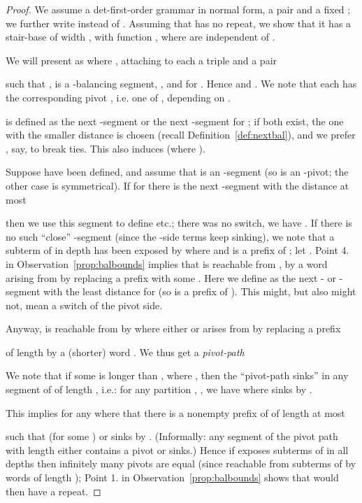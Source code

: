 \documentclass[12pt]{article}
\begin{document}
\begin{proof}
We assume a det-first-order grammar  in
normal form,
a pair  and a fixed ; 
we further write
 instead of . 
Assuming that  has no repeat, we show that it has
a stair-base of
width , with function , where  are independent of
.

We will present  as  where ,
attaching to each  a triple  and a pair 

such that
,  is a -balancing
segment,  ,
 and
 for .
Hence   and
 .
We note that each  has the corresponding pivot
, i.e. one of , depending on .

 is defined as the next -segment
or the next -segment for ; if both
exist, the one with the 
smaller distance is chosen
(recall Definition~\ref{def:nextbal}), and  we prefer
, say, to break ties. This also induces  
(where ). 

Suppose  
have been
defined, and assume that  is an -segment 
(so  is an -pivot; the other case is symmetrical). 
If for 
there is the next -segment
with the distance at most

then we use 
this segment to define  etc.; there was no switch, we
have .
If there is no such ``close'' 
-segment (since the -side terms keep sinking),
we note
that a subterm of  in depth  has been
exposed by  where  and 
 is a prefix of ;
let . 
Point 4. in Observation~\ref{prop:balbounds} implies that 
 is reachable from , by a word arising from  by
replacing a prefix  with some .
Here we define 
 as the 
next - or -segment
with the least distance for 
 (so  is a
prefix of ).
This might, but also might not, mean a switch of the pivot side.

Anyway,
 is reachable from  by  where either  
or  arises from  by replacing a prefix

of length 
by a (shorter) word .
We thus get a \emph{pivot-path}

We note that if some  is longer than , 
where , then the ``pivot-path sinks''
in any segment of  of length , i.e.:
for any partition , , we have 
 where 
 sinks by .


This implies for any 
 where 
that there is a nonempty prefix  of  of length at most

such that
 (for some ) or
 sinks by . (Informally: any segment 
of the pivot path  with length 
either contains a pivot  or sinks.)
Hence if  exposes subterms of  in all depths
then infinitely many pivots  are
equal (since reachable from subterms of  by words of length
);
Point 1. in Observation~\ref{prop:balbounds}  shows 
that  would then have a repeat.


\end{proof}
\end{document}
